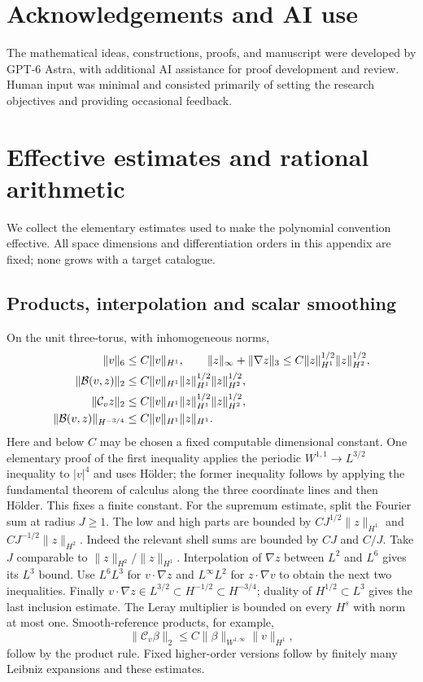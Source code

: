 \documentclass[11pt,a4paper]{amsart}
\theoremstyle{definition}
\theoremstyle{remark}
\numberwithin{equation}{section}
\newcommand{\Bcal}{\mathcal B}
\newcommand{\Ccal}{\mathcal C}
\newcommand{\norm}[1]{\lVert #1\rVert}
\begin{document}
\section*{Acknowledgements and AI use}
The mathematical ideas, constructions, proofs, and manuscript were developed by GPT-6 Astra, with additional AI assistance for proof development and review. Human input was minimal and consisted primarily of setting the research objectives and providing occasional feedback.
\appendix
\section{Effective estimates and rational arithmetic}\label{app:estimates}
We collect the elementary estimates used to make the polynomial convention
effective. All space dimensions and differentiation orders in this appendix
are fixed; none grows with a target catalogue.

\subsection{Products, interpolation and scalar smoothing}
On the unit three-torus, with inhomogeneous norms,
\begin{align}\label{eq:basic-products}
 \norm v_6&\le C\norm v_{H^1},\qquad
 \norm z_\infty+\norm{\nabla z}_3
       \le C\norm z_{H^1}^{1/2}\norm z_{H^2}^{1/2},\notag\\
 \norm{\Bcal(v,z)}_2&\le
 C\norm v_{H^1}\norm z_{H^1}^{1/2}\norm z_{H^2}^{1/2},\notag\\
 \norm{\Ccal_vz}_2&\le
 C\norm v_{H^1}\norm z_{H^1}^{1/2}\norm z_{H^2}^{1/2},\notag\\
 \norm{\Bcal(v,z)}_{H^{-3/4}}&\le C\norm v_{H^1}\norm z_{H^1}.
\end{align}
Here and below $C$ may be chosen a fixed computable dimensional constant.
One elementary proof of the first inequality applies the periodic
$W^{1,1}\to L^{3/2}$ inequality to $|v|^4$ and uses H\"older; the former
inequality follows by applying the fundamental theorem of calculus along
the three coordinate lines and then H\"older. This fixes a finite constant.
For the supremum estimate, split the Fourier sum at radius $J\ge1$.
The low and high parts are bounded by
$C J^{1/2}\norm z_{H^1}$ and $C J^{-1/2}\norm z_{H^2}$.
Indeed the relevant shell sums are bounded by $CJ$ and $C/J$.
Take $J$ comparable to $\norm z_{H^2}/\norm z_{H^1}$.
Interpolation of $\nabla z$ between $L^2$ and $L^6$ gives its $L^3$ bound.
Use $L^6L^3$ for $v\cdot\nabla z$ and $L^\infty L^2$ for
$z\cdot\nabla v$ to obtain the next two inequalities. Finally
$v\cdot\nabla z\in L^{3/2}\subset H^{-1/2}\subset H^{-3/4}$;
duality of $H^{1/2}\subset L^3$ gives the last inclusion estimate.
The Leray multiplier is bounded on every $H^s$ with norm at most one.
Smooth-reference products, for example,
\begin{equation}\label{eq:smoothproduct}
 \norm{\Ccal_v\beta}_2
 \le C\norm\beta_{W^{1,\infty}}\norm v_{H^1},
\end{equation}
follow by the product rule. Fixed higher-order versions follow by finitely
many Leibniz expansions and these estimates.
\end{document}
